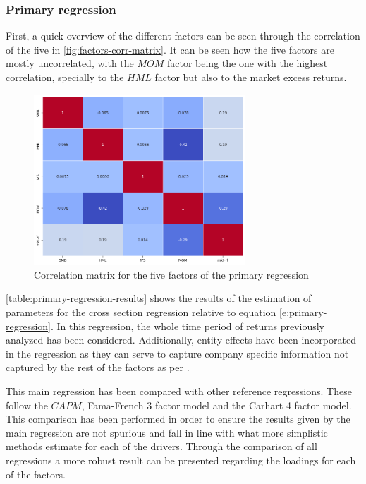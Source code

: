 \subsubsection{Primary regression}

First, a quick overview of the different factors can be seen through the correlation of the five in \autoref{fig:factors-corr-matrix}. It can be seen how the five factors are mostly uncorrelated, with the $MOM$ factor being the one with the highest correlation, specially to the $HML$ factor but also to the market excess returns. 

\begin{figure}[ht]
    \centering
    \includegraphics[width=300px]{assets/factors-corr-matrix.png}
    \caption{Correlation matrix for the five factors of the primary regression}
    \label{fig:factors-corr-matrix}
\end{figure}

\autoref{table:primary-regression-results} shows the results of the estimation of parameters for the cross section regression relative to equation \eqref{e:primary-regression}. In this regression, the whole time period of returns previously analyzed has been considered. Additionally, entity effects have been incorporated in the regression as they can serve to capture company specific information not captured by the rest of the factors as per \cite{ian_wagner_2019}. 

This main regression has been compared with other reference regressions. These follow the $CAPM$, Fama-French 3 factor model and the Carhart 4 factor model. This comparison has been performed in order to ensure the results given by the main regression are not spurious and fall in line with what more simplistic methods estimate for each of the drivers. Through the comparison of all regressions a more robust result can be presented regarding the loadings for each of the factors. 

